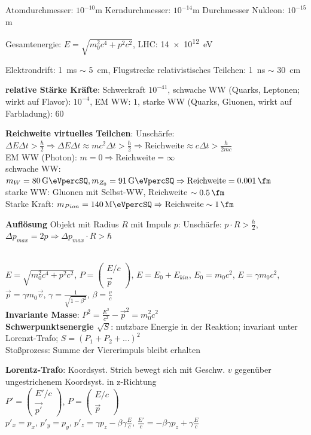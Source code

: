 \documentclass[10pt,twoside,a4paper]{article}
\newcommand{\Vek}[2]{\left(\begin{array}{c}#1\\#2\end{array}\right)}
\begin{document}
\begin{multicols*}{3}
Atomdurchmesser: $10^{-10}$\si{\meter}   Kerndurchmesser: $10^{-14}$\si{\meter}    Durchmesser Nukleon: $10^{-15}$\si{\meter}

Gesamtenergie: $E = \sqrt{m_0^2 c^4 + p^2 c^2}$, LHC: \SI{14e12}{\eV}

Elektrondrift: \SI{1}{\milli\second} $\sim$ \SI{5}{\cm}, Flugstrecke relativistisches Teilchen: \SI{1}{\nano\second} $\sim$ \SI{30}{\cm}

\textbf{relative Stärke Kräfte}: Schwerkraft $10^{-41}$, schwache WW (Quarks, Leptonen; wirkt auf Flavor): $10^{-4}$, EM WW: $1$, starke WW (Quarks, Gluonen, wirkt auf Farbladung): $60$

\textbf{Reichweite virtuelles Teilchen}: Unschärfe: $\Delta E \Delta t > \frac{\hbar}{2} \Rightarrow \Delta E \Delta t \approx mc^2 \Delta t > \frac{\hbar}{2} \Rightarrow \text{Reichweite} \approx c \Delta t > \frac{\hbar}{2mc}$ \\
EM WW (Photon): $m = 0 \Rightarrow \text{Reichweite} = \infty$ \\
schwache WW: $m_W = \SI[per-mode=symbol,per-symbol=/]{80}{\giga\eVpercSQ}, m_{Z_0} = \SI[per-mode=symbol,per-symbol=/]{91}{\giga\eVpercSQ} \Rightarrow \text{Reichweite} = \SI{0.001}{\fm}$  \\
starke WW: Gluonen mit Selbst-WW, Reichweite $\sim \SI{0.5}{\fm}$ \\
Starke Kraft: $m_{Pion} = \SI[per-mode=symbol,per-symbol=/]{140}{\mega\eVpercSQ} \Rightarrow \text{Reichweite} \sim \SI{1}{\fm}$

\textbf{Auflösung} Objekt mit Radius $R$ mit Impuls $p$: Unschärfe: $p \cdot R > \frac{\hbar}{2}$, $\Delta p_{max} = 2p \Rightarrow \Delta p_{max} \cdot R > \hbar$

\ \\
$E = \sqrt{m_0^2 c^4 + p^2 c^2}$, $P = \Vek{E/c}{\vec{p}}$, $E = E_0 + E_{kin}$, $E_0 = m_0 c^2$, $E = \gamma m_0 c^2$, $\vec{p} = \gamma m_0 \vec{v}$, $\gamma = \frac{1}{\sqrt{1 - \beta^2}}$, $\beta = \frac{v}{c}$ \\
\textbf{Invariante Masse}: $P^2 = \frac{E^2}{c^2} - \vec{p}^2 = m^2_0 c^2$ \\
\textbf{Schwerpunktsenergie $\sqrt{S}$}: nutzbare Energie in der Reaktion; invariant unter Lorenzt-Trafo; $S = (P_1 + P_2 + ...)^2$  \\
Stoßprozess: Summe der Viererimpuls bleibt erhalten

\textbf{Lorentz-Trafo}: Koordsyst. Strich bewegt sich mit Geschw. $v$ gegenüber ungestrichenem Koordsyst. in z-Richtung \\
$P' = \Vek{E'/c}{\vec{p'}}$, $P = \Vek{E/c}{\vec{p}}$ \\
$p'_x = p_x$, $p'_y = p_y$, $p'_z = \gamma p_z - \beta \gamma \frac{E}{c}$, $\frac{E'}{c} = - \beta \gamma p_z + \gamma \frac{E}{c}$


\end{multicols*}
\end{document}
